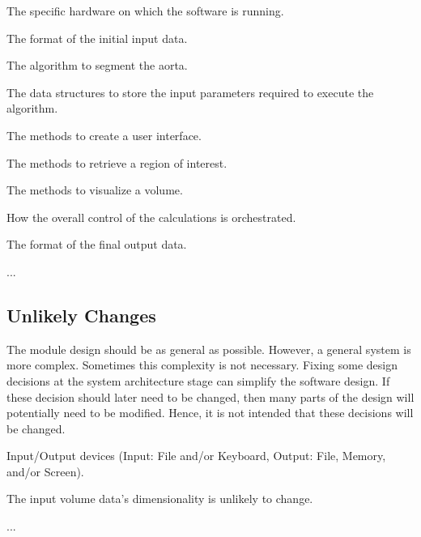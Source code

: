 \documentclass[12pt, titlepage]{article}
\newcounter{acnum}
\newcommand{\actheacnum}{AC\theacnum}
\newcounter{ucnum}
\newcommand{\uctheucnum}{UC\theucnum}
\begin{document}
\begin{description}
\item[ \actheacnum \label{acHardware}:] The specific hardware on which the software is running.
\item[ \actheacnum \label{acInput}:] The format of the initial input data.
\item[ \actheacnum \label{acAlgo}:] The algorithm to segment the aorta.
\item[ \actheacnum \label{acInputParams}:] The data structures to store the input parameters required to execute the algorithm.
\item[ \actheacnum \label{acInterface}:] The methods to create a user interface.
\item[ \actheacnum \label{acGetROI}:] The methods to retrieve a region of interest.
\item[ \actheacnum \label{acVisualize}:] The methods to visualize a volume.
\item[ \actheacnum \label{acControl}:] How the overall control of the calculations is orchestrated.
\item[ \actheacnum \label{acOutput}:] The format of the final output data.

\item ...
\end{description}

\subsection{Unlikely Changes} \label{SecUchange}

The module design should be as general as possible. However, a general system is
more complex. Sometimes this complexity is not necessary. Fixing some design
decisions at the system architecture stage can simplify the software design. If
these decision should later need to be changed, then many parts of the design
will potentially need to be modified. Hence, it is not intended that these
decisions will be changed.

\begin{description}
\item[ \uctheucnum \label{ucIO}:] Input/Output devices
  (Input: File and/or Keyboard, Output: File, Memory, and/or Screen).
\item[ \uctheucnum \label{ucVolDim}:] The input volume data's dimensionality is unlikely to change.
\item ...
\end{description}
\end{document}
